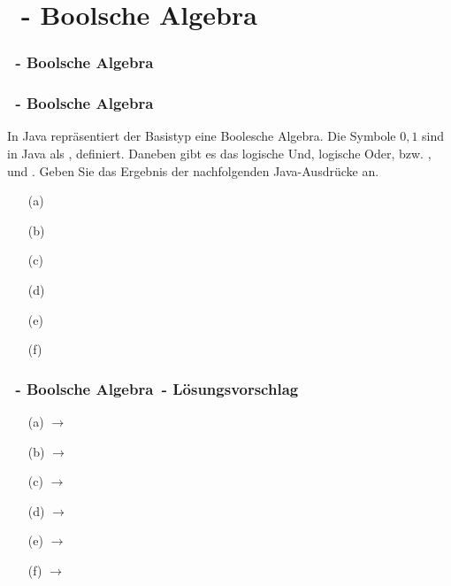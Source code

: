 \def\stitle{\theexercise\ - Boolsche Algebra}
\section{\stitle}
\begin{frame}
    \frametitle{\stitle}%
\tableofcontents[current]
\end{frame}

\begin{frame}[t]
  \frametitle{\stitle}

In Java repräsentiert der Basistyp  eine Boolesche Algebra.
Die Symbole $0, 1$ sind in Java als ,  definiert.
Daneben gibt es das logische Und, logische Oder, bzw. \code{\&\&}, \code{||} und \code{!}.
Geben Sie das Ergebnis der nachfolgenden Java-Ausdrücke an.
\medskip

\begin{minipage}{0.49\textwidth}
\begin{itemize}
\item[(a)] 
\item[(b)] 
\item[(c)] 
\end{itemize}
\end{minipage}
\begin{minipage}{0.49\textwidth}
\begin{itemize}
\item[(d)] 
\item[(e)] 
\item[(f)] 
\end{itemize}
\end{minipage}
\end{frame}

\begin{frame}[t]
  \frametitle{\stitle\ - L\"osungsvorschlag}
\begin{center}
\begin{minipage}{0.49\textwidth}
\begin{itemize}
\item[(a)]       $\rightarrow$ 
\item[(b)]       $\rightarrow$ 
\item[(c)] $\rightarrow$ 
\end{itemize}
\end{minipage}
\begin{minipage}{0.49\textwidth}
\begin{itemize}
\item[(d)] $\rightarrow$ 
\item[(e)]              $\rightarrow$ 
\item[(f)]    $\rightarrow$ 
\end{itemize}
\end{minipage}
\end{center}

\end{frame}
